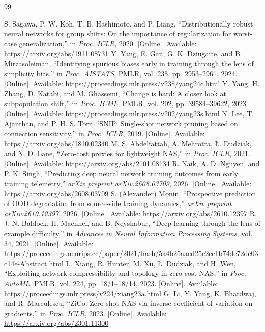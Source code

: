 \begin{thebibliography}{99}
\raggedright
{} S. Sagawa, P. W. Koh, T. B. Hashimoto, and P. Liang, ``Distributionally robust neural networks for group shifts: On the importance of regularization for worst-case generalization,'' in \emph{Proc. ICLR}, 2020. [Online]. Available: \url{https://arxiv.org/abs/1911.08731}
 Y. Yang, E. Gan, G. K. Dziugaite, and B. Mirzasoleiman, ``Identifying spurious biases early in training through the lens of simplicity bias,'' in \emph{Proc. AISTATS}, PMLR, vol. 238, pp. 2953--2961, 2024. [Online]. Available: \url{https://proceedings.mlr.press/v238/yang24c.html}
 Y. Yang, H. Zhang, D. Katabi, and M. Ghassemi, ``Change is hard: A closer look at subpopulation shift,'' in \emph{Proc. ICML}, PMLR, vol. 202, pp. 39584--39622, 2023. [Online]. Available: \url{https://proceedings.mlr.press/v202/yang23s.html}
 N. Lee, T. Ajanthan, and P. H. S. Torr, ``SNIP: Single-shot network pruning based on connection sensitivity,'' in \emph{Proc. ICLR}, 2019. [Online]. Available: \url{https://arxiv.org/abs/1810.02340}
 M. S. Abdelfattah, A. Mehrotra, \L{}. Dudziak, and N. D. Lane, ``Zero-cost proxies for lightweight NAS,'' in \emph{Proc. ICLR}, 2021. [Online]. Available: \url{https://arxiv.org/abs/2101.08134}
 R. Naik, A. D. Nguyen, and P. K. Singh, ``Predicting deep neural network training outcomes from early training telemetry,'' \emph{arXiv preprint arXiv:2608.03709}, 2026. [Online]. Available: \url{https://arxiv.org/abs/2608.03709}
 S. (Alexander) Monin, ``Prospective prediction of OOD degradation from source-side training dynamics,'' \emph{arXiv preprint arXiv:2610.12397}, 2026. [Online]. Available: \url{https://arxiv.org/abs/2610.12397}
 R. J. N. Baldock, H. Maennel, and B. Neyshabur, ``Deep learning through the lens of example difficulty,'' in \emph{Advances in Neural Information Processing Systems}, vol. 34, 2021. [Online]. Available: \url{https://proceedings.neurips.cc/paper/2021/hash/5a4b25aaed25c2ee1b74de72dc03c14e-Abstract.html}
 L. Xiang, R. Hunter, M. Xu, \L{}. Dudziak, and H. Wen, ``Exploiting network compressibility and topology in zero-cost NAS,'' in \emph{Proc. AutoML}, PMLR, vol. 224, pp. 18/1--18/14, 2023. [Online]. Available: \url{https://proceedings.mlr.press/v224/xiang23a.html}
 G. Li, Y. Yang, K. Bhardwaj, and R. Marculescu, ``ZiCo: Zero-shot NAS via inverse coefficient of variation on gradients,'' in \emph{Proc. ICLR}, 2023. [Online]. Available: \url{https://arxiv.org/abs/2301.11300}

\end{thebibliography}
